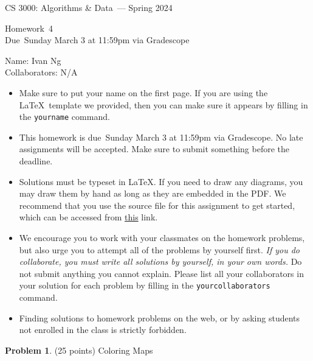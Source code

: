\documentclass[11pt]{article}
\newcommand{\yourname}{Ivan Ng}
\newcommand{\yourcollaborators}{N/A}
\theoremstyle{definition}
\theoremstyle{theorem}
\newtheorem{prob}{Problem}
\newcommand{\course}{CS 3000: Algorithms \& Data}
\newcommand{\semester}{Spring 2024}
\newcommand{\hwnum}{4}
\newcommand{\hwdue}{Sunday March 3 at 11:59pm via Gradescope}
\begin{document}
{\Large 
\begin{center} \course\ --- \semester\ \end{center}}
{\large
\vspace{10pt}
\noindent Homework~\hwnum \vspace{2pt}\\
Due~\hwdue}

\vspace{15pt}
\bigskip
{\large
\noindent Name: \yourname \vspace{2pt}\\ Collaborators: \yourcollaborators}

\vspace{15pt}
\begin{itemize}

\item
  Make sure to put your name on the first page.  If you are using the
  \LaTeX~template we provided, then you can make sure it appears by
  filling in the \texttt{yourname} command.

\item This homework is due~\hwdue.  No late assignments will be accepted.  Make sure to submit something before the deadline.

\item Solutions must be typeset in \LaTeX.  If you need to draw any diagrams,
  you may draw them by hand as long as they are embedded in the PDF.
  We recommend that you use the source file for this assignment to get started, which can be accessed from \href{https://www.overleaf.com/read/jypqtzqttwmn#ba02b5}{this} link.

\item We encourage you to work with your classmates on the homework
  problems, but also urge you to attempt all of the problems by
  yourself first. \emph{If you do collaborate, you must write all
    solutions by yourself, in your own words.}  Do not submit anything
  you cannot explain.  Please list all your collaborators in your
  solution for each problem by filling in the
  \texttt{yourcollaborators} command.

\item Finding solutions to homework problems on the web, or by asking
  students not enrolled in the class is strictly forbidden.

\end{itemize}
\newpage

\begin{prob}
	(25 points) Coloring Maps
\end{prob}
\end{document}
